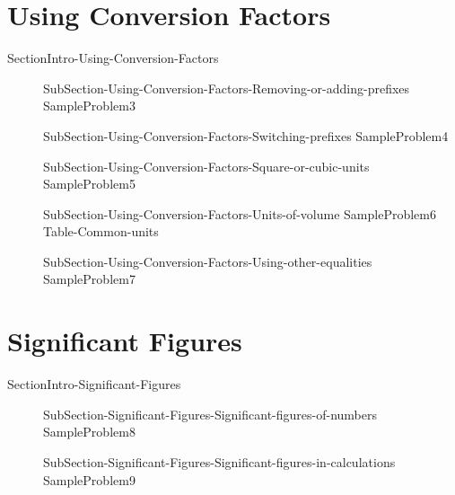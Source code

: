 \documentclass[main.tex]{subfiles}
\newcommand\chapterlabel{Ch-measurements}\setcounter{figurenewcounter}{0}\setcounter{tablenewcounter}{0}\setcounter{formulanewcounter}{0}
\begin{document}
\section{Using Conversion Factors}
{SectionIntro-Using-Conversion-Factors}
\sloppy\begin{description}
\item[]{SubSection-Using-Conversion-Factors-Removing-or-adding-prefixes}
{SampleProblem3}
\item[]{SubSection-Using-Conversion-Factors-Switching-prefixes}
{SampleProblem4}
\item[]{SubSection-Using-Conversion-Factors-Square-or-cubic-units}
{SampleProblem5}
\item[]{SubSection-Using-Conversion-Factors-Units-of-volume}
{SampleProblem6}
{Table-Common-units}
\item[]{SubSection-Using-Conversion-Factors-Using-other-equalities}
{SampleProblem7}
\end{description}

\section{Significant Figures}
{SectionIntro-Significant-Figures}
\sloppy\begin{description}
\item[]{SubSection-Significant-Figures-Significant-figures-of-numbers}
{SampleProblem8}
\item[]{SubSection-Significant-Figures-Significant-figures-in-calculations}
{SampleProblem9}
\end{description}

 
\end{document}
